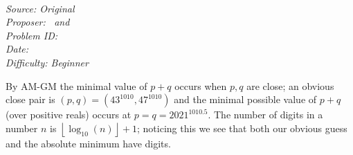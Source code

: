 \SSbreak\\
\emph{Source: Original}\\
\emph{Proposer: \Ptan\, and \Pwen}\\
\emph{Problem ID:}\\
\emph{Date: }\\
\emph{Difficulty: Beginner}\\
\SSbreak

\bigskip

\begin{solution}\hfil\medskip
  
By AM-GM the minimal value of $p + q$ occurs when $p, q$ are close; an obvious close pair is $(p, q) = \left(43^{1010}, 47^{1010}\right)$
and the minimal possible value of $p + q$ (over positive reals) occurs at $p = q = 2021^{1010.5}$. The number of digits in a number $n$
is $\left\lfloor \log_{10}(n) \right\rfloor + 1$; noticing this we see that both our obvious guess and the absolute minimum have  digits.
\end{solution}\bigskip
